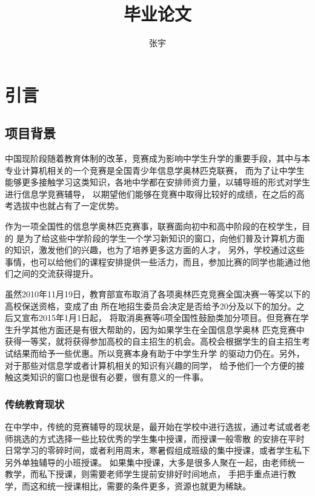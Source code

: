 \documentclass[UTF8,10pt,a4paper]{ctexart}
\begin{document}
\title{毕业论文}
\date{}

\author{张宇}

\maketitle

\tableofcontents
\thispagestyle{fancy}
\lhead{} %
\chead{} %
\rhead{} %
\lfoot{} %
\cfoot{\thepage} %
\rfoot{} %
\renewcommand{\headrulewidth}{0pt} %
\renewcommand{\footrulewidth}{0.5pt} %
\pagestyle{fancy}

\newpage

\section{引言}

  \subsection{项目背景}
  中国现阶段随着教育体制的改革，竞赛成为影响中学生升学的重要手段，其中与本专业计算机相关的一个竞赛是全国青少年信息学奥林匹克联赛，
  而为了让中学生能够更多接触学习这类知识，各地中学都在安排师资力量，以辅导班的形式对学生进行信息学竞赛辅导，
  以期望他们能够在竞赛中取得比较好的成绩，在之后的高考选拔中也就占有了一定优势。

  作为一项全国性的信息学奥林匹克赛事，联赛面向初中和高中阶段的在校学生，目的
  是为了给这些中学阶段的学生一个学习新知识的窗口，向他们普及计算机方面的知识，激发他们的兴趣，也为了培养更多这方面的人才，
  另外，学校通过这些事情，也可以给他们的课程安排提供一些活力，而且，参加比赛的同学也能通过他们之间的交流获得提升。

  虽然2010年11月19日，教育部宣布取消了各项奥林匹克竞赛全国决赛一等奖以下的高校保送资格，变成了由
  所在地招生委员会决定是否给予20分及以下的加分。之后又宣布2015年1月1日起，
  将取消奥赛等6项全国性鼓励类加分项目。但竞赛在学生升学其他方面还是有很大帮助的，因为如果学生在全国信息学奥林 匹克竞赛中获得一等奖，就将获得参加高校的自主招生的机会。高校会根据学生的自主招生考试结果而给予一些优惠。所以竞赛本身有助于中学生升学 的驱动力仍在。另外，对于那些对信息学或者计算机相关的知识有兴趣的同学，
  给予他们一个方便的接触这类知识的窗口也是很有必要，很有意义的一件事。

     \subsubsection{传统教育现状}
     在中学中，传统的竞赛辅导的现状是，最开始在学校中进行选拔，通过考试或者老师挑选的方式选择一些比较优秀的学生集中授课，而授课一般零散 的安排在平时日常学习的零碎时间，或者利用周末，寒暑假组成班级的集中授课，或者学生私下另外单独辅导的小班授课。
     如果集中授课，大多是很多人聚在一起，由老师统一教学，而私下授课，则需要老师学生提前安排好时间地点，
     手把手重点进行教学，而这和统一授课相比，需要的条件更多，资源也就更为稀缺。
\end{document}
